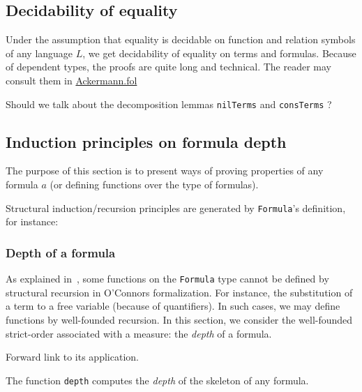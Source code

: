 \subsection{Decidability of equality}

Under the assumption that equality is decidable on 
function and relation symbols of any language $L$,
we get decidability of equality on terms and formulas.
Because of dependent types, the proofs are quite long and technical. The reader may consult them in \href{../theories/html/hydras.Ackermann.fol.html}{Ackermann.fol}

\begin{todo}
  Should we talk about the decomposition lemmas
\texttt{nilTerms} and \texttt{consTerms} ?
\end{todo}


\subsection{Induction principles on formula depth}

The purpose of this section is to present ways of proving 
properties of any formula $a$ (or defining functions over the type of formulas).

Structural induction/recursion principles are generated by 
\texttt{Formula}'s definition, for instance:








\subsubsection{Depth of a formula}
As explained in~\cite{OConnor05}, some functions on the \texttt{Formula} type cannot be defined by structural recursion in 
O'Connors formalization. For instance, the substitution of a term to a free variable (because of quantifiers). 
In such cases, we may define functions by well-founded recursion. In this section, we consider the well-founded strict-order associated with a measure: the \emph{depth} of a formula.

\begin{todo}
Forward link to its application.
\end{todo}


The function \texttt{depth} computes the \emph{depth} of the 
 skeleton of any formula.


